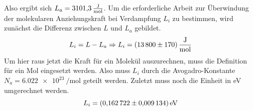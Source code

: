 Also ergibt sich $L_a = \SI{3101.3}{\frac{\J}{\mol}}$.
Um die erforderliche Arbeit zur Überwindung der molekularen Anziehungskraft bei Verdampfung $L_i$ zu bestimmen, wird
zunächst die Differenz zwischen $L$ und $L_a$ gebildet.
\begin{equation}
    L_i = L - L_a \Rightarrow L_i = \SI{13800 \pm 170}{\frac{\J}{\mol}}
\end{equation}
Um hier raus jetzt die Kraft für ein Molekül auszurechnen, muss die Definition für ein Mol eingesetzt werden.
Also muss $L_i$ durch die Avogadro-Konstante $N_a = \SI{6.022e23}{\per\mol}$ \cite{Avogadro} geteilt werden.
Zuletzt muss noch die Einheit in eV umgerechnet werden.
\begin{equation*}
  L_i = \SI{0.162722 \pm 0.009134 }{eV}
\end{equation*}

